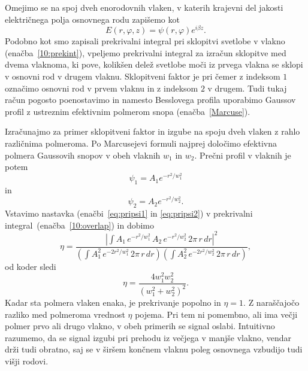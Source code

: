 Omejimo se na spoj dveh enorodovnih vlaken, v katerih krajevni del jakosti 
električnega polja osnovnega rodu zapišemo kot
\begin{equation}
E(r, \varphi, z)=\psi(r, \varphi) e^{i\beta z}.
\end{equation} 
Podobno kot smo zapisali prekrivalni integral pri sklopitvi svetlobe v vlakno (enačba~\ref{10:prekint}),
vpeljemo prekrivalni integral za izračun sklopitve med dvema vlaknoma,
ki pove, kolikšen delež svetlobe moči iz prvega vlakna 
se sklopi v osnovni rod v drugem vlaknu. Sklopitveni faktor je
pri čemer z indeksom $1$ označimo osnovni rod v prvem vlaknu in z indeksom $2$ v drugem. 
Tudi tukaj račun pogosto poenostavimo in namesto Besslovega profila uporabimo 
Gaussov profil z ustreznim efektivnim polmerom snopa (enačba~\ref{Marcuse}).

Izračunajmo za primer sklopitveni faktor in izgube na spoju dveh vlaken z rahlo 
različnima polmeroma. Po Marcusejevi formuli najprej določimo efektivna polmera Gaussovih snopov
v obeh vlaknih $w_1$ in $w_2$. Prečni profil v vlaknih je potem
\begin{equation}
\label{eq:pripsi1}
\psi_{1} = A_{1} e^{-r^2/w_{1}^2}
\end{equation}
in 
\begin{equation}
\label{eq:pripsi2}
\psi_{2} = A_{2} e^{-r^2/w_{2}^2}.
\end{equation}
Vstavimo nastavka (enačbi~\ref{eq:pripsi1} in \ref{eq:pripsi2}) 
v prekrivalni integral~(enačba~\ref{10:overlap}) in dobimo
\begin{equation}
\eta = \frac{|\int A_1 \, e^{-r^2/w_1^2}\, A_2\, e^{-r^2/w_2^2}\, 2 \pi\, r\, dr|^2}
{\left(\int A_1^2 \,e^{-2r^2/w_1^2} \, 2 \pi \, r\, dr \right) \left(\int A_2^2\, 
e^{-2r^2/w_2^2}\, 2 \pi \, r\, dr \right)},
\label{10:prekintw}
\end{equation}
od koder sledi
\begin{equation}
\eta = \frac{4 w_1^2 w_2^2}{(w_1^2+w_2^2)^2}.
\label{10:w1w2}
\end{equation}
Kadar sta polmera vlaken enaka, je prekrivanje popolno in $\eta = 1$. Z naraščajočo razliko
med polmeroma vrednost $\eta$ pojema. Pri tem
ni pomembno, ali ima večji polmer prvo ali drugo vlakno, v obeh primerih se signal oslabi. 
Intuitivno razumemo, da se signal izgubi pri prehodu iz večjega v manjše vlakno, 
vendar drži tudi obratno, saj se v širšem končnem vlaknu poleg osnovnega vzbudijo
tudi višji rodovi. 

